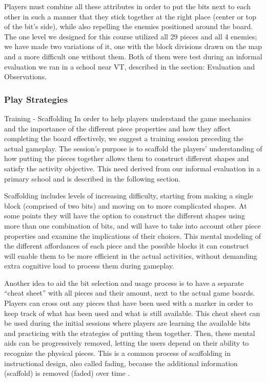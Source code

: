 \documentclass{acm_proc_article-sp}
\begin{document}
Players must combine all these attributes in order to put the bits next to each other in such a manner that they stick together at the right place (center or top of the bit's side), while also repelling the enemies positioned around the board. The one level we designed for this course utilized all 29 pieces and all 4 enemies; we have made two variations of it, one with the block divisions drawn on the map and a more difficult one without them. Both of them were test during an informal evaluation we ran in a school near VT, described in the section: Evaluation and Observations.

\subsubsection{Play Strategies}
Training - Scaffolding
In order to help players understand the game mechanics and the importance of the different piece properties and how they affect completing the board effectively, we suggest a training session preceding the actual gameplay. The session's purpose is to scaffold the players' understanding of how putting the pieces together allows them to construct different shapes and satisfy the activity objective. This need derived from our informal evaluation in a primary school and is described in the following section.

Scaffolding includes levels of increasing difficulty, starting from making a single block (comprised of two bits) and moving on to more complicated shapes. At some points they will have the option to construct the different shapes using more than one combination of bits, and will have to take into account other piece properties and examine the implications of their choices. This mental modeling of the different affordances of each piece and the possible blocks it can construct will enable them to be more efficient in the actual activities, without demanding extra cognitive load to process them during gameplay. 

Another idea to aid the bit selection and usage process is to have a separate ``cheat sheet'' with all pieces and their amount, next to the actual game boards. Players can cross out any pieces that have been used with a marker in order to keep track of what has been used and what is still available. This cheat sheet can be used during the initial sessions where players are learning the available bits and practicing with the strategies of putting them together. Then, these mental aids can be progressively removed, letting the users depend on their ability to recognize the physical pieces. This is a common process of scaffolding in instructional design, also called fading, because the additional information (scaffold) is removed (faded) over time \cite{driscoll2005psychology}.
\end{document}
